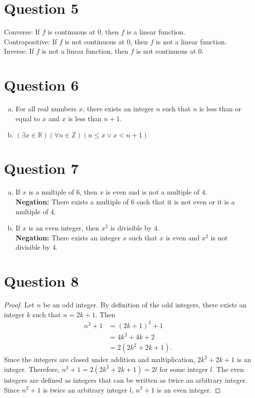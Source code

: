 \documentclass{article}
\begin{document}
\section*{Question 5}
Converse: If $f$ is continuous at 0, then $f$ is a linear function. \\
Contrapositive: If $f$ is not continuous at 0, then $f$ is not a linear function. \\
Inverse: If $f$ is not a linear function, then $f$ is not continuous at 0. \\

\section*{Question 6}
\begin{enumerate}[(a)]
    \item For all real numbers $x$, there exists an integer $n$ such that $n$ is less than or equal to $x$ and $x$ is less than $n+1$.
    \item $(\exists x \in \mathbb{R}) (\forall n \in \mathbb{Z}) (n \leq x \lor x < n + 1)$
\end{enumerate}

\section*{Question 7}
\begin{enumerate}[(a)]
    \item If $x$ is a multiple of 6, then $x$ is even and is not a multiple of 4. \\
        \textbf{Negation:} There exists a multiple of 6 such that it is not even or it is a multiple of 4.
    \item If $x$ is an even integer, then $x^2$ is divisible by 4. \\
        \textbf{Negation:} There exists an integer $x$ such that $x$ is even and $x^2$ is not divisible by 4.
\end{enumerate}

\section*{Question 8}
\begin{proof}
    Let $n$ be an odd integer.
    By definition of the odd integers, there exists an integer $k$ such that $n = 2k + 1$.
    Then \begin{align*}
        n^2 + 1 &= (2k + 1)^2 + 1 \\
                &= 4k^2 + 4k + 2 \\
                &= 2(2k^2 + 2k + 1).
    \end{align*}
    Since the integers are closed under addition and multiplication, $2k^2 + 2k + 1$ is an integer.
    Therefore, $n^2 + 1 = 2(2k^2 + 2k + 1) = 2l$ for some integer $l$.
    The even integers are defined as integers that can be written as twice an arbitrary integer.
    Since $n^2 + 1$ is twice an arbitrary integer $l$, $n^2 + 1$ is an even integer.
\end{proof}
\end{document}
